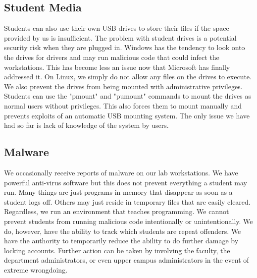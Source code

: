 \subsection{Student Media}
Students can also use their own USB drives to store their files if the space provided by us is insufficient.  The problem with student drives is a potential security risk when they are plugged in.  Windows has the tendency to look onto the drives for drivers and may run malicious code that could infect the workstations.  This has become less an issue now that Microsoft has finally addressed it.  On Linux, we simply do not allow any files on the drives to execute.  We also prevent the drives from being mounted with administrative privileges.  Students can use the "pmount" and "pumount" commands to mount the drives as normal users without privileges.  This also forces them to mount manually and prevents exploits of an automatic USB mounting system.  The only issue we have had so far is lack of knowledge of the system by users.

\subsection{Malware}
We occasionally receive reports of malware on our lab workstations.  We have powerful anti-virus software but this does not prevent everything a student may run.  Many things are just programs in memory that disappear as soon as a student logs off.  Others may just reside in temporary files that are easily cleared.  Regardless, we run an environment that teaches programming.  We cannot prevent students from running malicious code intentionally or unintentionally.  We do, however, have the ability to track which students are repeat offenders.  We have the authority to temporarily reduce the ability to do further damage by locking accounts.  Further action can be taken by involving the faculty, the department administrators, or even upper campus administrators in the event of extreme wrongdoing. 
